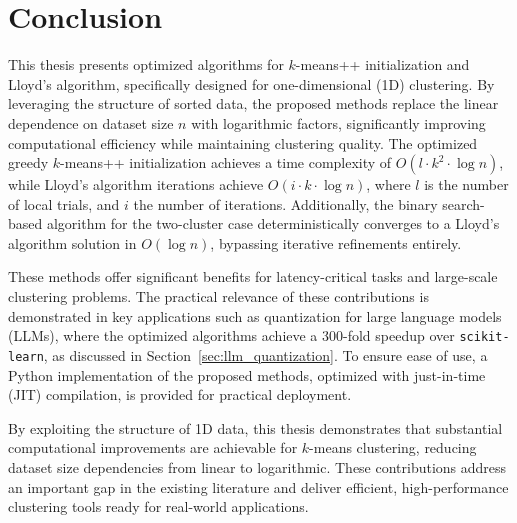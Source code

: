 \chapter{Conclusion}\label{chap:conclusion}

This thesis presents optimized algorithms for $k$-means++ initialization and Lloyd’s algorithm, specifically designed for one-dimensional (1D) clustering. By leveraging the structure of sorted data, the proposed methods replace the linear dependence on dataset size \(n\) with logarithmic factors, significantly improving computational efficiency while maintaining clustering quality. The optimized greedy $k$-means++ initialization achieves a time complexity of \(O(l \cdot k^2 \cdot \log n)\), while Lloyd’s algorithm iterations achieve \(O(i \cdot k \cdot \log n)\), where \(l\) is the number of local trials, and \(i\) the number of iterations. Additionally, the binary search-based algorithm for the two-cluster case deterministically converges to a Lloyd’s algorithm solution in \(O(\log n)\), bypassing iterative refinements entirely.

These methods offer significant benefits for latency-critical tasks and large-scale clustering problems. The practical relevance of these contributions is demonstrated in key applications such as quantization for large language models (LLMs), where the optimized algorithms achieve a 300-fold speedup over \texttt{scikit-learn}, as discussed in Section~\ref{sec:llm_quantization}. To ensure ease of use, a Python implementation of the proposed methods, optimized with just-in-time (JIT) compilation, is provided for practical deployment.

By exploiting the structure of 1D data, this thesis demonstrates that substantial computational improvements are achievable for $k$-means clustering, reducing dataset size dependencies from linear to logarithmic. These contributions address an important gap in the existing literature and deliver efficient, high-performance clustering tools ready for real-world applications.
